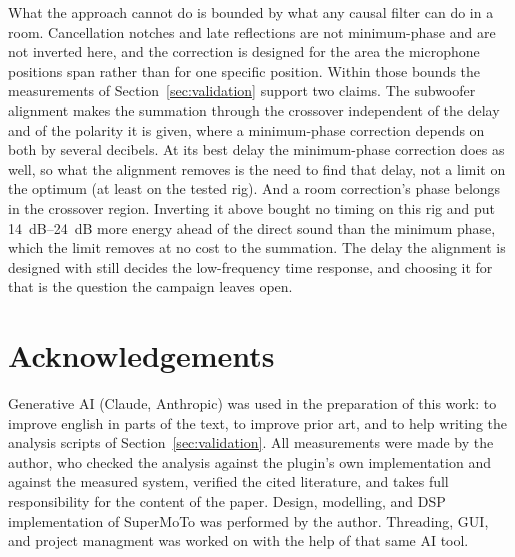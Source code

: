 \documentclass[10pt,a4paper]{article}
\begin{document}
What the approach cannot do is bounded by what any causal filter can do in a room. Cancellation notches and late reflections are not minimum-phase and are not inverted here, and the correction is designed for the area the microphone positions span rather than for one specific position. Within those bounds the measurements of Section~\ref{sec:validation} support two claims. The subwoofer alignment makes the summation through the crossover independent of the delay and of the polarity it is given, where a minimum-phase correction depends on both by several decibels. At its best delay the minimum-phase correction does as well, so what the alignment removes is the need to find that delay, not a limit on the optimum (at least on the tested rig). And a room correction's phase belongs in the crossover region. Inverting it above bought no timing on this rig and put \SIrange{14}{24}{\dB} more energy ahead of the direct sound than the minimum phase, which the limit removes at no cost to the summation. The delay the alignment is designed with still decides the low-frequency time response, and choosing it for that is the question the campaign leaves open.

\section{Acknowledgements}

Generative AI (Claude, Anthropic) was used in the preparation of this work: to improve english in parts of the text, to improve prior art, and to help writing the analysis scripts of Section~\ref{sec:validation}. All measurements were made by the author, who checked the analysis against the plugin's own implementation and against the measured system, verified the cited literature, and takes full responsibility for the content of the paper. Design, modelling, and DSP implementation of SuperMoTo was performed by the author. Threading, GUI, and project managment was worked on with the help of that same AI tool.
\end{document}
